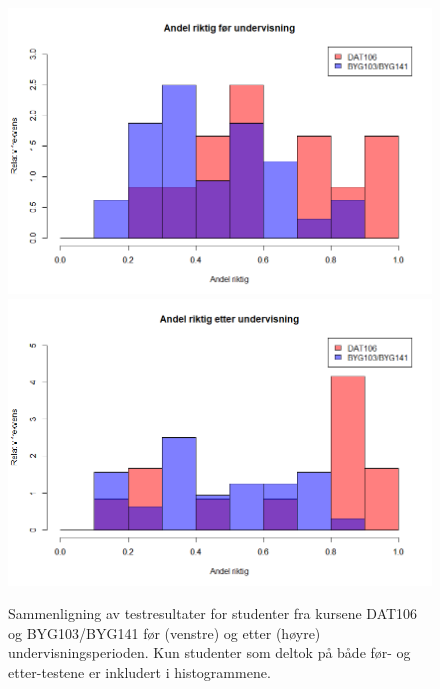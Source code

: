 \documentclass[a4paper,norsk,12pt]{article}
\begin{document}
\begin{figure}[tp]
	\includegraphics[width=.48\textwidth]{./preScore}
	\includegraphics[width=.48\textwidth]{./postScore}
	\caption{Sammenligning av testresultater for studenter fra kursene DAT106 og  BYG103/BYG141 før (venstre) og etter (høyre) undervisningsperioden. Kun studenter som deltok på både før- og etter-testene er inkludert i histogrammene.}
	\label{fig:testScoreMatch}
\end{figure}
\end{document}
